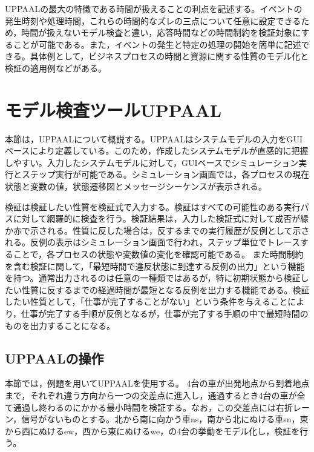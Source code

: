 \documentclass{tpu-sotu}
\begin{document}
	UPPAALの最大の特徴である時間が扱えることの利点を記述する。イベントの発生時刻や処理時間，これらの時間的なズレの三点について任意に設定できるため，時間が扱えないモデル検査と違い，応答時間などの時間制約を検証対象にすることが可能である。また，イベントの発生と特定の処理の開始を簡単に記述できる。具体例として，ビジネスプロセスの時間と資源に関する性質のモデル化と検証の適用例などがある\cite{a9}。
	\section{モデル検査ツールUPPAAL}
	本節は，UPPAALについて概説する。UPPAALはシステムモデルの入力をGUIベースにより定義している。このため，作成したシステムモデルが直感的に把握しやすい。入力したシステムモデルに対して，GUIベースでシミュレーション実行とステップ実行が可能である。シミュレーション画面では，各プロセスの現在状態と変数の値，状態遷移図とメッセージシーケンスが表示される。
	
	検証は検証したい性質を検証式で入力する。検証はすべての可能性のある実行パスに対して網羅的に検査を行う。検証結果は，入力した検証式に対して成否が緑か赤で示される。性質に反した場合は，反するまでの実行履歴が反例として示される。反例の表示はシミュレーション画面で行われ，ステップ単位でトレースすることで，各プロセスの状態や変数値の変化を確認可能である。
	また時間制約を含む検証に関して，「最短時間で違反状態に到達する反例の出力」という機能を持つ。通常出力されるのは任意の一種類ではあるが，特に初期状態から検証したい性質に反するまでの経過時間が最短となる反例を出力する機能である。検証したい性質として，「仕事が完了することがない」という条件を与えることにより，仕事が完了する手順が反例となるが，仕事が完了する手順の中で最短時間のものを出力することになる。
	\subsection{UPPAALの操作}
	本節では，例題を用いてUPPAALを使用する。
	4台の車が出発地点から到着地点まで，それぞれ違う方向から一つの交差点に進入し，通過するとき4台の車が全て通過し終わるのにかかる最小時間を検証する。なお，この交差点には右折レーン，信号がないものとする。北から南に向かう車ns，南から北にぬける車sn，東から西にぬけるew，西から東にぬけるwe，の4台の挙動をモデル化し，検証を行う。
	
\end{document}
